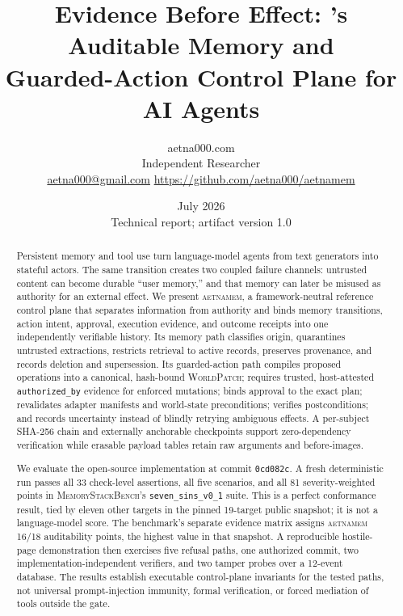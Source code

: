 \documentclass[10pt,twocolumn]{article}
\title{\vspace{-1.5em}\textbf{Evidence Before Effect: \system's Auditable Memory and\\Guarded-Action Control Plane for AI Agents}}
\author{aetna000.com\\\small Independent Researcher\\\small \href{mailto:aetna000@gmail.com}{aetna000@gmail.com} \quad \url{https://github.com/aetna000/aetnamem}}
\date{July 2026\\\small Technical report; artifact version 1.0}
\newcommand{\system}{\textsc{aetnamem}}
\newcommand{\benchmark}{\textsc{MemoryStackBench}}
\newcommand{\worldpatch}{\textsc{WorldPatch}}
\newcommand{\code}[1]{\texttt{#1}}
\begin{document}
\maketitle

\begin{abstract}
Persistent memory and tool use turn language-model agents from text generators into stateful actors. The same transition creates two coupled failure channels: untrusted content can become durable ``user memory,'' and that memory can later be misused as authority for an external effect. We present \system, a framework-neutral reference control plane that separates information from authority and binds memory transitions, action intent, approval, execution evidence, and outcome receipts into one independently verifiable history. Its memory path classifies origin, quarantines untrusted extractions, restricts retrieval to active records, preserves provenance, and records deletion and supersession. Its guarded-action path compiles proposed operations into a canonical, hash-bound \worldpatch; requires trusted, host-attested \code{authorized\_by} evidence for enforced mutations; binds approval to the exact plan; revalidates adapter manifests and world-state preconditions; verifies postconditions; and records uncertainty instead of blindly retrying ambiguous effects. A per-subject SHA-256 chain and externally anchorable checkpoints support zero-dependency verification while erasable payload tables retain raw arguments and before-images.

We evaluate the open-source implementation at commit \code{0cd082c}. A fresh deterministic run passes all 33 check-level assertions, all five scenarios, and all 81 severity-weighted points in \benchmark's \code{seven\_sins\_v0\_1} suite. This is a perfect conformance result, tied by eleven other targets in the pinned 19-target public snapshot; it is not a language-model score. The benchmark's separate evidence matrix assigns \system{} 16/18 auditability points, the highest value in that snapshot. A reproducible hostile-page demonstration then exercises five refusal paths, one authorized commit, two implementation-independent verifiers, and two tamper probes over a 12-event database. The results establish executable control-plane invariants for the tested paths, not universal prompt-injection immunity, formal verification, or forced mediation of tools outside the gate.
\end{abstract}















\balance
{\footnotesize


}

\clearpage
\appendix
\onecolumn

\end{document}
